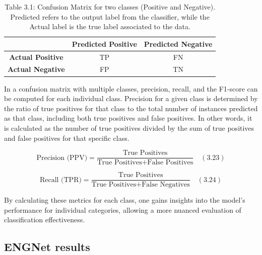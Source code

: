 \documentclass{Configuration_Files/PoliMi3i_thesis}
\begin{document}
\begin{table}[H]
\centering
\caption*{Table 3.1: Confusion Matrix for two classes (Positive and Negative). Predicted refers to the output label from the classifier, while the Actual label is the true label associated to the data.}
\begin{tabular}{|c|c|c|}
\hline
 & \textbf{Predicted Positive} & \textbf{Predicted Negative} \\
\hline
\textbf{Actual Positive} & TP & FN \\
\hline
\textbf{Actual Negative} & FP & TN \\
\hline
\end{tabular}
\end{table}

In a confusion matrix with multiple classes, precision, recall, and the F1-score can be computed for each individual class. Precision for a given class is determined by the ratio of true positives for that class to the total number of instances predicted as that class, including both true positives and false positives. In other words, it is calculated as the number of true positives divided by the sum of true positives and false positives for that specific class. \cite{tesiDavide}

\begin{equation}
	\text{Precision (PPV)} = \frac{\text{True Positives}}{\text{True Positives} + \text{False Positives}} \quad (3.23)
	\end{equation}
	
	\begin{equation}
	\text{Recall (TPR)} = \frac{\text{True Positives}}{\text{True Positives} + \text{False Negatives}} \quad (3.24)
	\end{equation}

By calculating these metrics for each class, one gains insights into the model’s performance for individual categories, allowing a more nuanced evaluation of classification effectiveness.

\subsection{ENGNet results}
\end{document}
